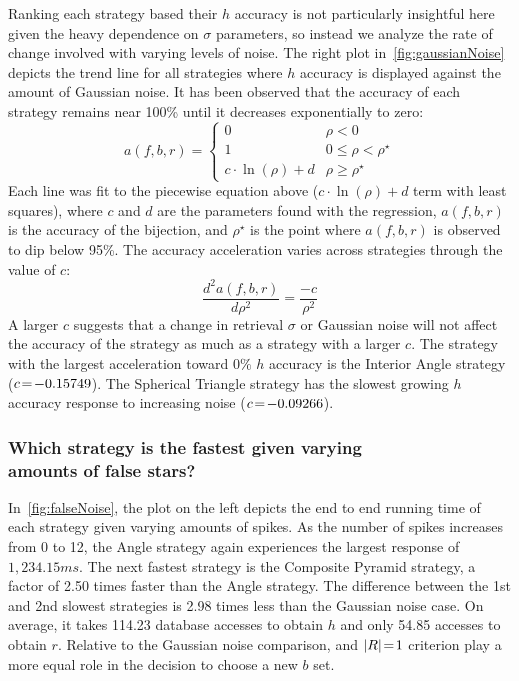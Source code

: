 Ranking each strategy based their $h$ accuracy is not particularly insightful here given the heavy dependence on
$\sigma$ parameters, so instead we analyze the rate of change involved with varying levels of noise.
The right plot in~\autoref{fig:gaussianNoise} depicts the trend line for all strategies where $h$ accuracy is displayed
against the amount of Gaussian noise.
It has been observed that the accuracy of each strategy remains near 100\% until it decreases exponentially to zero:
\begin{equation}
    a(f, b, r) =
    \begin{cases}
        0 & \rho < 0 \\
        1 & 0 \leq \rho < \rho^{\star} \\
        c \cdot \ln(\rho) + d & \rho \geq \rho^{\star}
    \end{cases}
\end{equation}
Each line was fit to the piecewise equation above ($c\cdot \ln(\rho) + d$ term with least squares), where $c$ and $d$
are the parameters found with the regression, $a(f, b, r)$ is the accuracy of the bijection, and $\rho^{\star}$ is the
point where $a(f, b, r)$ is observed to dip below 95\%.
The accuracy acceleration varies across strategies through the value of $c$:
\begin{equation}
    \frac{d^{2}a(f, b, r)}{d\rho^2} = \frac{-c}{\rho^2}
\end{equation}
A larger $c$ suggests that a change in retrieval $\sigma$ or Gaussian noise will not affect the accuracy of the strategy
as much as a strategy with a larger $c$.
The strategy with the largest acceleration toward $0\%$ $h$ accuracy is the Interior Angle strategy ($c \!=\! -0.15749$).
The Spherical Triangle strategy has the slowest growing $h$ accuracy response to increasing noise ($c \!=\! -0.09266$).

\subsubsection{Which strategy is the fastest given varying \\ amounts of false stars?}
In~\autoref{fig:falseNoise}, the plot on the left depicts the end to end running time of each strategy given varying
amounts of spikes.
As the number of spikes increases from 0 to 12, the Angle strategy again experiences the largest response of
$1{,}234.15\si{ms}$.
The next fastest strategy is the Composite Pyramid strategy, a factor of 2.50 times faster than the Angle strategy.
The difference between the 1st and 2nd slowest strategies is 2.98 times less than the Gaussian noise case.
On average, it takes 114.23 database accesses to obtain $h$ and only 54.85 accesses to obtain $r$.
Relative to the Gaussian noise comparison,  and $\left| R \right| \!=\! 1$ criterion play a more equal role in
the decision to choose a new $b$ set.

